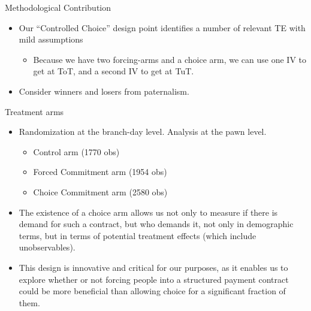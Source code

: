 \documentclass[8pt]{beamer}
\begin{document}
\begin{frame}{Methodological Contribution}
\begin{itemize}
    \vfill \item Our ``Controlled Choice'' design point identifies a number of relevant TE with mild assumptions
    \begin{itemize}
        \item Because we have two forcing-arms and a choice arm, we can use one IV to get at ToT, and a second IV to get at TuT.
    \end{itemize}
    
    
   \vfill  \item Consider winners and losers from paternalism.     

    
  


\end{itemize}
\end{frame}





\begin{frame}{Treatment arms}
\label{treatment_arms}
   \begin{itemize}
    \vfill \item Randomization at the branch-day level.  Analysis at the pawn level.
    \begin{itemize}
        \vfill \item Control arm (1770 obs)
       \vfill \item Forced Commitment arm (1954 obs)
       \vfill \item Choice Commitment arm (2580 obs)
    \end{itemize}
    \vfill \item The existence of a choice arm allows us not only to measure if there is demand for such a contract, but who demands it, not only in demographic terms, but in terms of potential treatment effects (which include unobservables).
   \vfill \item  This design is innovative and critical for our purposes, as it enables us to explore whether or not forcing people into a structured payment contract could be more beneficial than allowing choice for a significant fraction of them.
\end{itemize}
\end{frame}
\end{document}
